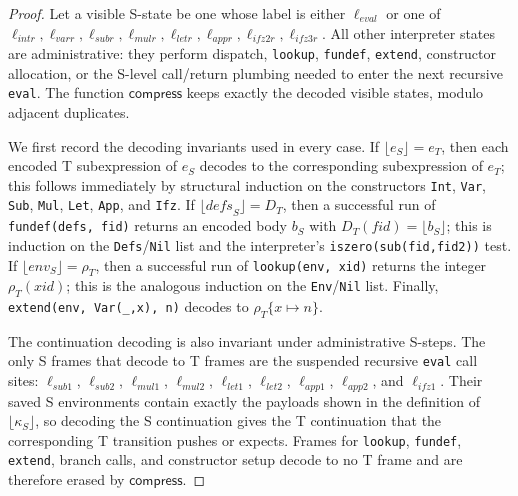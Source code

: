 \documentclass[11pt]{article}
\begin{document}
\begin{proof}
Let a visible S-state be one whose label is either \(\ell_{\textit{eval}}\) or one of
\(\ell_{\textit{intr}}, \ell_{\textit{varr}}, \ell_{\textit{subr}}, \ell_{\textit{mulr}},
\ell_{\textit{letr}}, \ell_{\textit{appr}}, \ell_{\textit{ifz2r}}, \ell_{\textit{ifz3r}}\).
All other interpreter states are administrative: they perform dispatch, \texttt{lookup},
\texttt{fundef}, \texttt{extend}, constructor allocation, or the S-level call/return plumbing
needed to enter the next recursive \texttt{eval}.
The function \(\mathsf{compress}\) keeps exactly the decoded visible states, modulo adjacent duplicates.

We first record the decoding invariants used in every case.
If \(\lfloor e_S\rfloor=e_T\), then each encoded T subexpression of \(e_S\) decodes to the
corresponding subexpression of \(e_T\); this follows immediately by structural induction on
the constructors \texttt{Int}, \texttt{Var}, \texttt{Sub}, \texttt{Mul}, \texttt{Let},
\texttt{App}, and \texttt{Ifz}.
If \(\lfloor \textit{defs}_S\rfloor=D_T\), then a successful run of
\texttt{fundef(defs, fid)} returns an encoded body \(b_S\) with \(D_T(\textit{fid})=\lfloor b_S\rfloor\);
this is induction on the \texttt{Defs}/\texttt{Nil} list and the interpreter's
\texttt{iszero(sub(fid,fid2))} test.
If \(\lfloor \textit{env}_S\rfloor=\rho_T\), then a successful run of
\texttt{lookup(env, xid)} returns the integer \(\rho_T(\textit{xid})\); this is the analogous
induction on the \texttt{Env}/\texttt{Nil} list.
Finally, \texttt{extend(env, Var(\_,x), n)} decodes to \(\rho_T\{x\mapsto n\}\).

The continuation decoding is also invariant under administrative S-steps.
The only S frames that decode to T frames are the suspended recursive \texttt{eval} call sites:
\(\ell_{\textit{sub1}}\), \(\ell_{\textit{sub2}}\), \(\ell_{\textit{mul1}}\),
\(\ell_{\textit{mul2}}\), \(\ell_{\textit{let1}}\), \(\ell_{\textit{let2}}\),
\(\ell_{\textit{app1}}\), \(\ell_{\textit{app2}}\), and \(\ell_{\textit{ifz1}}\).
Their saved S environments contain exactly the payloads shown in the definition of
\(\lfloor\kappa_S\rfloor\), so decoding the S continuation gives the T continuation that the
corresponding T transition pushes or expects.  Frames for \texttt{lookup}, \texttt{fundef},
\texttt{extend}, branch calls, and constructor setup decode to no T frame and are therefore
erased by \(\mathsf{compress}\).


\end{proof}
\end{document}
